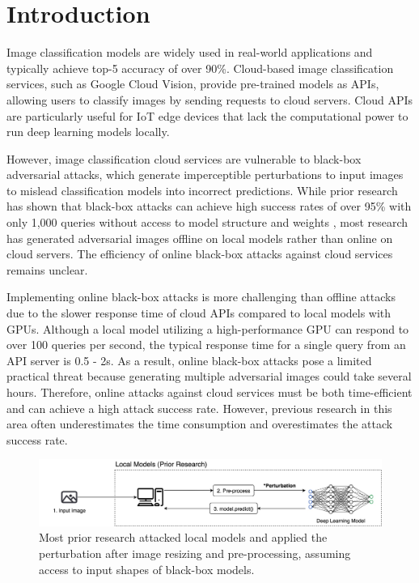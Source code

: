 


\section{Introduction}
\label{sec:introduction}
Image classification models are widely used in real-world applications and typically achieve top-5 accuracy of over 90\%. Cloud-based image classification services, such as Google Cloud Vision, provide pre-trained models as APIs, allowing users to classify images by sending requests to cloud servers. Cloud APIs are particularly useful for IoT edge devices that lack the computational power to run deep learning models locally.


However, image classification cloud services are vulnerable to black-box adversarial attacks, which generate imperceptible perturbations to input images to mislead classification models into incorrect predictions. While prior research has shown that black-box attacks can achieve high success rates of over 95\% with only 1,000 queries without access to model structure and weights \cite{bhambri2019survey}, most research has generated adversarial images offline on local models rather than online on cloud servers. The efficiency of online black-box attacks against cloud services remains unclear.

Implementing online black-box attacks is more challenging than offline attacks due to the slower response time of cloud APIs compared to local models with GPUs. Although a local model utilizing a high-performance GPU can respond to over 100 queries per second, the typical response time for a single query from an API server is 0.5 - 2s. As a result, online black-box attacks pose a limited practical threat because generating multiple adversarial images could take several hours. Therefore, online attacks against cloud services must be both time-efficient and can achieve a high attack success rate. However, previous research in this area often underestimates the time consumption and overestimates the attack success rate.

\begin{figure}[tbp]
    \centering
    \includegraphics[width=\linewidth]{figures/chapter_classification/local.jpg}
    \caption{Most prior research attacked local models and applied the perturbation after image resizing and pre-processing, assuming access to input shapes of black-box models.}
    \label{fig:local}
\end{figure}

